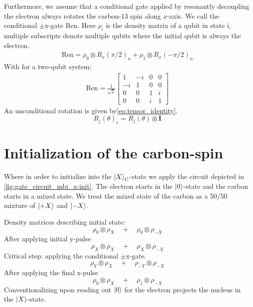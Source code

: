Furthermore, we assume that a conditional gate applied by resonantly decoupling the electron always rotates the carbon-13 spin along $x$-axis.
We call the conditional $\pm\mathrm{x}$-gate $\bm{\mathrm{Ren}}$. Here $\rho_{i}$ is the density matrix of a qubit in state i, multiple subscripts denote multiple qubits where the initial qubit is always the electron.
\begin{align}
    \bm{\mathrm{Ren}} = \rho_{0}\otimes R_x(\pi/2)_n + \rho_{1}\otimes R_x(-\pi/2)_n
    \end{align}
    With for a two-qubit system:
    \begin{align}
    \bm{\mathrm{Ren}} = \frac{1}{\sqrt{2}}
        \begin{bmatrix}
            1& -i &0 &0 \\
            -i & 1 &0 &0 \\
            0 & 0 &1 &i \\
            0 & 0 &i &1
        \end{bmatrix}
\end{align}
An unconditional rotation is given by\cref{eq:tensor_identity}.
\begin{equation}
    R_j(\theta)_e = R_j(\theta) \otimes \bm{I}
    \label{eq:tensor_identity}
\end{equation}

\section{Initialization of the carbon-spin}

Where in order to initialize into the ${\left\vert{X}\right\rangle}_\mathrm{C}$-state we apply the circuit depicted in \cref{fig:gate_circuit_mbi_x-init}.
The electron starts in the ${\left\vert{0}\right\rangle}$-state and the carbon starts in a mixed state.
We treat the mixed state of the carbon as a 50/50 mixture of ${\left\vert{+X}\right\rangle}$ and ${\left\vert{-X}\right\rangle}$.

Density matrices describing initial state:
\begin{equation}
    \rho_0\otimes \rho_X \quad + \quad \rho_0\otimes \rho_{-X}
    \end{equation}
After applying initial y-pulse
    \begin{equation}
    \rho_X\otimes \rho_X \quad + \quad \rho_X\otimes \rho_{-X}
    \end{equation}
Critical step: applying the conditional $\pm{\mathrm{x}}$-gate.
    \begin{equation}
    \rho_Y\otimes \rho_X \quad + \quad \rho_{-Y}\otimes \rho_{-X}
    \end{equation}
After applying the final x-pulse
    \begin{equation}
    \rho_0\otimes \rho_X \quad + \quad \rho_1\otimes \rho_{-X}
    \end{equation}
Conventionalizing upon reading out ${\left\vert{0}\right\rangle}$ for the electron projects the nucleus in the ${\left\vert{X}\right\rangle}$-state.

